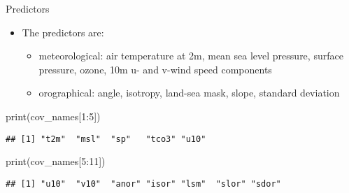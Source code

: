 \documentclass[
  ignorenonframetext,
]{beamer}
\newenvironment{Shaded}{\begin{snugshade}}{\end{snugshade}}
\newcommand{\DecValTok}[1]{\textcolor[rgb]{0.00,0.00,0.81}{#1}}
\newcommand{\FunctionTok}[1]{\textcolor[rgb]{0.00,0.00,0.00}{#1}}
\newcommand{\NormalTok}[1]{#1}
\newcommand{\SpecialCharTok}[1]{\textcolor[rgb]{0.00,0.00,0.00}{#1}}
\providecommand{\tightlist}{%
  \setlength{\itemsep}{0pt}\setlength{\parskip}{0pt}}
\begin{document}
\begin{frame}[fragile]{Predictors}
\protect\hypertarget{predictors}{}
\begin{itemize}
\tightlist
\item
  The predictors are:

  \begin{itemize}
  \tightlist
  \item
    meteorological: air temperature at 2m, mean sea level pressure,
    surface pressure, ozone, 10m u- and v-wind speed components
  \item
    orographical: angle, isotropy, land-sea mask, slope, standard
    deviation
  \end{itemize}
\end{itemize}

\begin{Shaded}
\begin{Highlighting}[]
\FunctionTok{print}\NormalTok{(cov\_names[}\DecValTok{1}\SpecialCharTok{:}\DecValTok{5}\NormalTok{])}
\end{Highlighting}
\end{Shaded}

\begin{verbatim}
## [1] "t2m"  "msl"  "sp"   "tco3" "u10"
\end{verbatim}

\begin{Shaded}
\begin{Highlighting}[]
\FunctionTok{print}\NormalTok{(cov\_names[}\DecValTok{5}\SpecialCharTok{:}\DecValTok{11}\NormalTok{])}
\end{Highlighting}
\end{Shaded}

\begin{verbatim}
## [1] "u10"  "v10"  "anor" "isor" "lsm"  "slor" "sdor"
\end{verbatim}
\end{frame}
\end{document}
